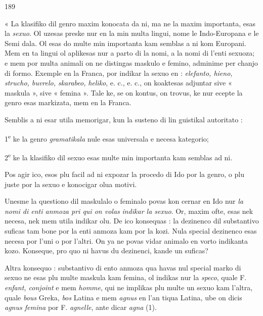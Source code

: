 \begin{VUpage}[193]{189}

« La klasifiko dil genro maxim konocata da ni, ma ne\nl
la maxim importanta, esas la \textit{sexuo}. Ol uzesas preske nur\nl
en la min multa lingui, nome le Indo-Europana e le Semi\cc
dala. Ol esas do multe min importanta kam semblas a ni\nl
kom Europani. Mem en ta lingui ol aplikesas nur a parto\nl
di la nomi, a la nomi di l'enti sexuoza; e mem por multa\nl
animali on ne distingas maskulo e femino, adminime per\nl
chanjo di formo. Exemple en la Franca, por indikar la\nl
sexuo en : \textit{elefanto, hieno, strucho, buvrelo, skarabeo,}\nl
\textit{heliko}, e. c., e. c., on koaktesas adjuntar sive « maskula »,\nl
sive « femina ». Tale ke, se on kontus, on trovus, ke nur\nl
ecepte la genro esas markizata, mem en la Franca.

Semblis a ni esar utila memorigar, kun la susteno di lin\cc
guistikal autoritato :

1\textsuperscript{e} ke la genro \textit{gramatikala} nule esas universala e necesa\nl
kategorio;

2\textsuperscript{e} ke la klasifiko dil sexuo esas multe min importanta\nl
kam semblas ad ni.

Pos agir ico, esos plu facil ad ni expozar la procedo di\nl
Ido por la genro, o plu juste por la sexuo e konocigar olua\nl
motivi.

Unesme la questiono dil maskulalo o feminalo povas kon\cc
cernar en Ido nur \textit{la nomi di enti anmoza pri qui on volas}\nl
\textit{indikar la sexuo}. Or, maxim ofte, esas nek necesa, nek mem\nl
utila indikar olu. De ico konsequas : la dezinenco  dil\nl
substantivo suficas tam bone por la enti anmoza kam por\nl
la kozi. Nula special dezinenco esas necesa por l'uni o por\nl
l'altri. On ya ne povas vidar animalo en vorto indikanta\nl
kozo. Konseque, pro quo ni havus du dezinenci, kande un\nl
suficas?

Altra konsequo : substantivo di ento anmoza qua havas\nl
nul special marko di sexuo ne esas plu multe maskula kam\nl
femina, ol indikas nur la \textit{speco}, quale F. \textit{enfant, conjoint}\nl
e mem \textit{homme}, qui ne implikas plu multe un sexuo kam\nl
l'altra, quale \textit{bous} Greka, \textit{bos} Latina e mem \textit{agnus} en l'an\cc
tiqua Latina, ube on dicis \textit{agnus femina} por F. \textit{agnelle}, ante\nl
dicar \textit{agna} (1).
\end{VUpage}

